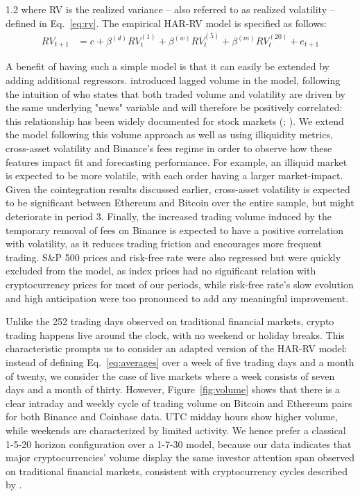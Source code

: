 \documentclass[10pt]{article}
\begin{document}
\begin{setstretch}{1.2}
\noindent where RV is the realized variance -- also referred to as realized volatility -- defined in Eq.~\ref{eq:rv}. The empirical HAR-RV model is specified as follows:
\begin{align}
RV_{t+1}&=c+\beta^{(d)}RV_t^{(1)}+\beta^{(w)}RV_t^{(5)}+\beta^{(m)}RV_t^{(20)}+e_{t+1} \tag{14} \label{eq:HAR-RV}
\end{align}

A benefit of having such a simple model is that it can easily be extended by adding additional regressors. \textcite{Tseng2015} introduced lagged volume in the model, following the intuition of \textcite{Clark1973} who states that both traded volume and volatility are driven by the same underlying "news" variable and will therefore be positively correlated: this relationship has been widely documented for stock markets (\cite{Gallant1992}; \cite{Andersen1996}). We extend the model following this volume approach as well as using illiquidity metrics, cross-asset volatility and Binance's fees regime in order to observe how these features impact fit and forecasting performance. For example, an illiquid market is expected to be more volatile, with each order having a larger market-impact. Given the cointegration results discussed earlier, cross-asset volatility is expected to be significant between Ethereum and Bitcoin over the entire sample, but might deteriorate in period 3. Finally, the increased trading volume induced by the temporary removal of fees on Binance is expected to have a positive correlation with volatility, as it reduces trading friction and encourages more frequent trading. S\&P 500 prices and risk-free rate were also regressed but were quickly excluded from the model, as index prices had no significant relation with cryptocurrency prices for most of our periods, while risk-free rate's slow evolution and high anticipation were too pronounced to add any meaningful improvement.

Unlike the 252 trading days observed on traditional financial markets, crypto trading happens live around the clock, with no weekend or holiday breaks. This characteristic prompts us to consider an adapted version of the HAR-RV model: instead of defining Eq.~\ref{eq:averages} over a week of five trading days and a month of twenty, we consider the case of live markets where a week consists of seven days and a month of thirty. However, Figure~\ref{fig:volume} shows that there is a clear intraday and weekly cycle of trading volume on Bitcoin and Ethereum pairs for both Binance and Coinbase data. UTC midday hours show higher volume, while weekends are characterized by limited activity. We hence prefer a classical 1-5-20 horizon configuration over a 1-7-30 model, because our data indicates that major cryptocurrencies' volume display the same investor attention span observed on traditional financial markets, consistent with cryptocurrency cycles described by \textcite{Hansen2024}.


\end{setstretch}
\end{document}
